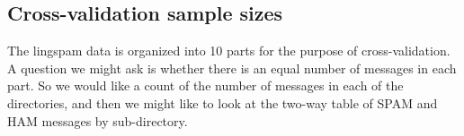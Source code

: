 \begin{comment}
To compute the number of SPAM messages, we can subtract these two
numbers in our head, or pull up a calculator on our computer to do it.
But what if we wanted to do it programmatically - can we use the
shell?  It turns out that it is
quite awkward. The basic shell has no concept of numbers.  It looks
like a programming language, but it really only deals with text and
words.  Again, we would have to delegate the subtraction to a command
or tool called by the shell.  The program \exec{bc} is calculator.
You can use it interactively, e.g.
\begin{verbatim}
% bc
1+2
3
\end{verbatim}
And we can set up a call to \exec{bc} with the values
computed from other commands.
\begin{verbatim}
echo "`find . -type f | wc -l` - `find . -type f -name 'spmsg*' | 
   wc -l`" | bc
\end{verbatim}
Running this, we get 2412!  But it is unsightly.
And we cannot easily use it to loop from 1 to 2412 as the
shell provides looping over words, not numbers.

Bash and some other shells do provide some basic arithmetic.
To add 1 and 2, we can use the command
\begin{verbatim}
 $((1 + 2))
\end{verbatim}
(You can use \exec{echo} to print the result.)
So the syntax is
math command inside two sets of parentheses
and a dollar sign to dereference the value in the result.
But note that this arithmetic is highly focused on integers
and not real numbers!

Our example above can be written  as
\begin{verbatim}
echo $((`find . -type f | wc -l` 
   - `find . -type f -name 'spmsg*' | wc -l`))
\end{verbatim}
but this is only marginally better, if at all.


A reasonable strategy to use is that if you are doing
more than the most elementary amount of arithmetic
in the shell for processing data, 
use R or some other language instead and call the shell
from these systems. 


By the way, we can also do basic counting loops using \shellKey{while} and 
\shellKey{until} and the \exec{test} operator to
evaluate the condition of interest.
\end{comment}

\subsection{Cross-validation sample sizes}
The lingspam data is organized into 10 parts for the purpose of
cross-validation.  A question we might ask is whether there is an
equal number of messages in each part. So we would like a count of the
number of messages in each of the  directories,
and then we might like to look at the two-way table of
SPAM and HAM messages by sub-directory.


